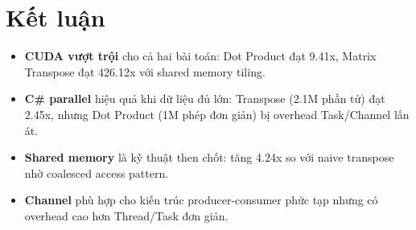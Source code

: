 \documentclass[12pt,a4paper]{article}
\begin{document}
\section{Kết luận}

\begin{itemize}
    \item \textbf{CUDA vượt trội} cho cả hai bài toán: Dot Product đạt 9.41x, Matrix Transpose đạt 426.12x với shared memory tiling.
    \item \textbf{C\# parallel} hiệu quả khi dữ liệu đủ lớn: Transpose (2.1M phần tử) đạt 2.45x, nhưng Dot Product (1M phép đơn giản) bị overhead Task/Channel lấn át.
    \item \textbf{Shared memory} là kỹ thuật then chốt: tăng 4.24x so với naive transpose nhờ coalesced access pattern.
    \item \textbf{Channel} phù hợp cho kiến trúc producer-consumer phức tạp nhưng có overhead cao hơn Thread/Task đơn giản.
\end{itemize}
\end{document}
